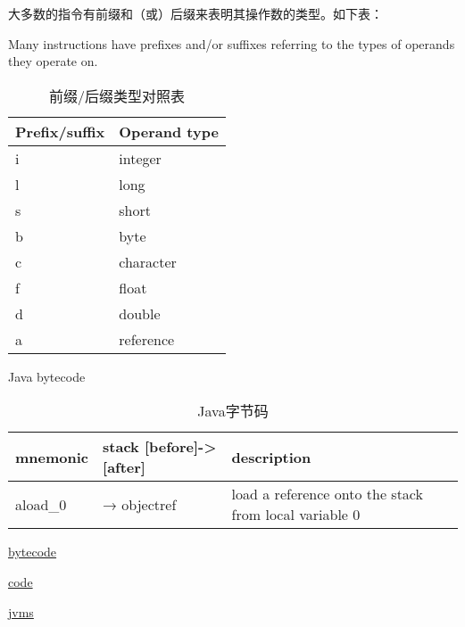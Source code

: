大多数的指令有前缀和（或）后缀来表明其操作数的类型。如下表：

Many instructions have prefixes and/or suffixes referring to the types of operands they operate on.

\begin{table}[H]
    \centering
    \caption{前缀/后缀类型对照表}
    \begin{tabular}{|l|l|}
    \hline
    Prefix/suffix & Operand type    \\ \hline
    i           & integer           \\ \hline
    l           & long             \\ \hline
    s           & short             \\ \hline
    b           & byte              \\ \hline
    c           & character         \\ \hline
    f           & float             \\ \hline
    d           & double            \\ \hline
    a           & reference         \\ \hline
    \end{tabular}
    \end{table}


Java bytecode

\begin{table}[H]
    \centering
    \caption{Java字节码}
    \begin{tabular}{|l|l|l|}
    \hline
    mnemonic    & stack [before]->[after]   & description                                           \\ \hline
    aload\_0    & → objectref               & load a reference onto the stack from local variable 0  \\ \hline
    \end{tabular}
    \end{table}


        
\href{https://en.wikipedia.org/wiki/Java_bytecode_instruction_listings}{bytecode}

\href{http://blog.jamesdbloom.com/JavaCodeToByteCode_PartOne.html}{code}

\href{https://docs.oracle.com/javase/specs/jvms/se8/html/jvms-4.html#jvms-4.10.1.9}{jvms}
  